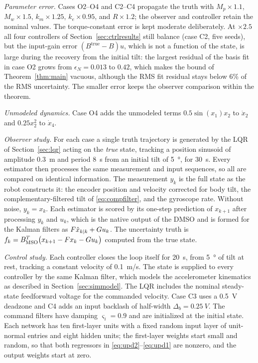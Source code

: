 \emph{Parameter error.} Cases O2--O4 and C2--C4 propagate the truth with
$M_p\times1.1$, $M_w\times1.5$, $k_m\times1.25$, $k_e\times0.95$, and $R\times1.2$;
the observer and controller retain the nominal values. The torque-constant
error is kept moderate deliberately. At $\times2.5$ all four controllers of
Section~\ref{sec:ctrlresults} still balance (case C2, five seeds), but the
input-gain error $(B^{\mathrm{true}}-B)u$, which is not a function of the state,
is large during the recovery from the initial tilt: the largest residual of the
basis fit in case O2 grows from $\epsilon_N=0.013$ to $0.42$, which makes the
bound of Theorem~\ref{thm:main} vacuous, although the RMS fit residual stays
below 6\% of the RMS uncertainty. The smaller error keeps the observer
comparison within the theorem.

\emph{Unmodeled dynamics.} Case O4 adds the unmodeled terms
$0.5\sin(x_1)x_2$ to $\dot x_2$ and $0.25x_2^2$ to $\dot x_4$.

\emph{Observer study.} For each case a single truth trajectory is generated by
the LQR of Section~\ref{sec:lqr} acting on the \emph{true} state, tracking a
position sinusoid of amplitude \SI{0.3}{m} and period \SI{8}{s} from an initial
tilt of \SI{5}{\degree}, for \SI{30}{s}. Every estimator then processes the same
measurement and input sequences, so all are compared on identical information.
The measurement $y_k$ is the full state as the robot constructs it: the encoder
position and velocity corrected for body tilt, the complementary-filtered tilt
of \eqref{eq:compfilter}, and the gyroscope rate. Without noise, $y_k=x_k$.
Each estimator is scored by its one-step prediction of $x_{k+1}$ after
processing $y_k$ and $u_k$, which is the native output of the DMSO and is
formed for the Kalman filters as $F\hat{x}_{k|k}+Gu_k$. The uncertainty truth is
$f_k=B_{\mathrm{MSO}}^T\bigl(x_{k+1}-Fx_k-Gu_k\bigr)$ computed from the true state.

\emph{Control study.} Each controller closes the loop itself for \SI{20}{s},
from \SI{5}{\degree} of tilt at rest, tracking a constant velocity of
\SI{0.1}{m/s}. The state is supplied to every controller by the same
Kalman filter, which models the accelerometer kinematics as described in
Section~\ref{sec:simmodel}. The LQR includes the nominal steady-state
feedforward voltage for the commanded velocity. Case C3 uses a
\SI{0.5}{V} deadzone and C4 adds an input backlash of half-width
$\Delta_b=\SI{0.25}{V}$. The command filters have damping $\varsigma_i=0.9$ and
are initialized at the initial state. Each network has ten first-layer units
with a fixed random input layer of unit-normal entries and eight hidden units;
the first-layer weights start small and random, so that both regressors in
\eqref{eq:upd2}--\eqref{eq:upd1} are nonzero, and the output weights start at
zero.

